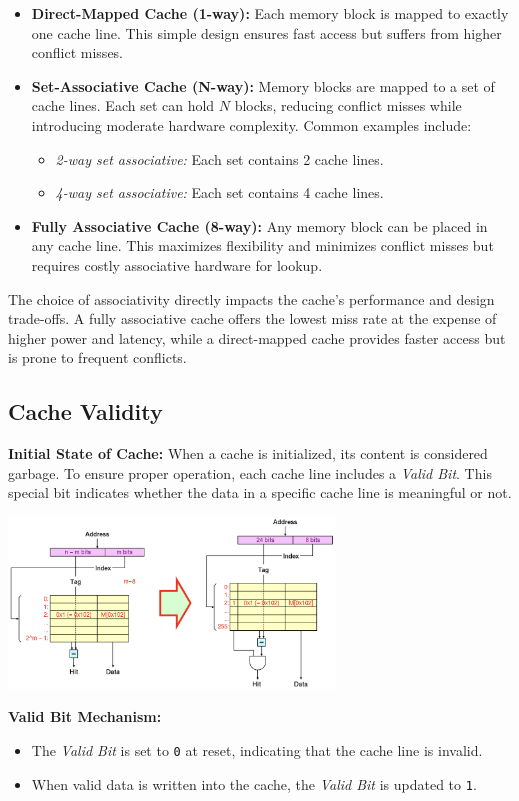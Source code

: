 \begin{itemize}
    \item \textbf{Direct-Mapped Cache (1-way):} Each memory block is mapped to exactly one cache line. This simple design ensures fast access but suffers from higher conflict misses.
    \item \textbf{Set-Associative Cache (N-way):} Memory blocks are mapped to a set of cache lines. Each set can hold \( N \) blocks, reducing conflict misses while introducing moderate hardware complexity. Common examples include:
    \begin{itemize}
        \item \textit{2-way set associative:} Each set contains 2 cache lines.
        \item \textit{4-way set associative:} Each set contains 4 cache lines.
    \end{itemize}
    \item \textbf{Fully Associative Cache (8-way):} Any memory block can be placed in any cache line. This maximizes flexibility and minimizes conflict misses but requires costly associative hardware for lookup.
\end{itemize}

The choice of associativity directly impacts the cache's performance and design trade-offs. A fully associative cache offers the lowest miss rate at the expense of higher power and latency, while a direct-mapped cache provides faster access but is prone to frequent conflicts.

\subsection{Cache Validity}

\textbf{Initial State of Cache:} When a cache is initialized, its content is considered garbage. To ensure proper operation, each cache line includes a \textit{Valid Bit}. This special bit indicates whether the data in a specific cache line is meaningful or not.
\begin{center}
    \includegraphics[width=0.65\textwidth]{chapters/chapter3a/images/valid.png}
\end{center}
\textbf{Valid Bit Mechanism:}
\begin{itemize}
    \item The \textit{Valid Bit} is set to \texttt{0} at reset, indicating that the cache line is invalid.
    \item When valid data is written into the cache, the \textit{Valid Bit} is updated to \texttt{1}.
\end{itemize}


